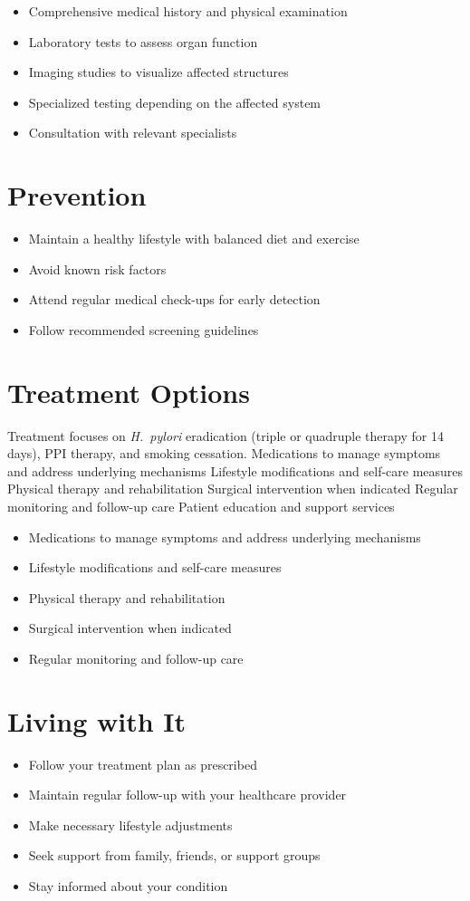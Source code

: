 \begin{itemize}[noitemsep]
  \item Comprehensive medical history and physical examination
  \item Laboratory tests to assess organ function
  \item Imaging studies to visualize affected structures
  \item Specialized testing depending on the affected system
  \item Consultation with relevant specialists
\end{itemize}
\section{Prevention}
\begin{itemize}[noitemsep]
  \item Maintain a healthy lifestyle with balanced diet and exercise
  \item Avoid known risk factors
  \item Attend regular medical check-ups for early detection
  \item Follow recommended screening guidelines
\end{itemize}
\section{Treatment Options}
Treatment focuses on \textit{H.~pylori} eradication (triple or quadruple therapy for 14 days), PPI therapy, and smoking cessation. Medications to manage symptoms and address underlying mechanisms Lifestyle modifications and self-care measures Physical therapy and rehabilitation Surgical intervention when indicated Regular monitoring and follow-up care Patient education and support services

\begin{itemize}[noitemsep]
  \item Medications to manage symptoms and address underlying mechanisms
  \item Lifestyle modifications and self-care measures
  \item Physical therapy and rehabilitation
  \item Surgical intervention when indicated
  \item Regular monitoring and follow-up care
\end{itemize}
\section{Living with It}
\begin{itemize}[noitemsep]
  \item Follow your treatment plan as prescribed
  \item Maintain regular follow-up with your healthcare provider
  \item Make necessary lifestyle adjustments
  \item Seek support from family, friends, or support groups
  \item Stay informed about your condition
\end{itemize}
